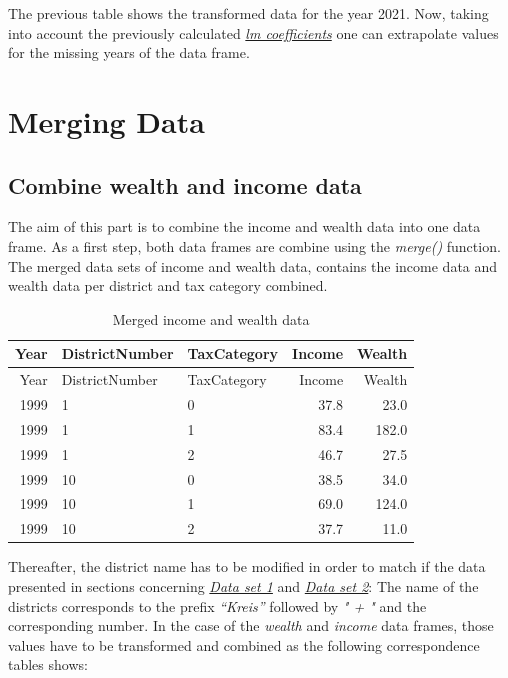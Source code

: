 \documentclass[
]{article}
\begin{document}
The previous table shows the transformed data for the year 2021. Now,
taking into account the previously calculated
\emph{\href{tab:pivot_education1}{lm coefficients}} one can extrapolate
values for the missing years of the data frame.

\pagebreak

\hypertarget{merging-data}{%
\section{Merging Data}\label{merging-data}}

\hypertarget{combine-wealth-and-income-data}{%
\subsection{Combine wealth and income
data}\label{combine-wealth-and-income-data}}

The aim of this part is to combine the income and wealth data into one
data frame. As a first step, both data frames are combine using the
\emph{merge()} function. The merged data sets of income and wealth data,
contains the income data and wealth data per district and tax category
combined.

\begin{longtable}[]{@{}rllrr@{}}
\caption{Merged income and wealth data}\tabularnewline
\toprule
Year & DistrictNumber & TaxCategory & Income & Wealth\tabularnewline
\midrule
\endfirsthead
\toprule
Year & DistrictNumber & TaxCategory & Income & Wealth\tabularnewline
\midrule
\endhead
1999 & 1 & 0 & 37.8 & 23.0\tabularnewline
1999 & 1 & 1 & 83.4 & 182.0\tabularnewline
1999 & 1 & 2 & 46.7 & 27.5\tabularnewline
1999 & 10 & 0 & 38.5 & 34.0\tabularnewline
1999 & 10 & 1 & 69.0 & 124.0\tabularnewline
1999 & 10 & 2 & 37.7 & 11.0\tabularnewline
\bottomrule
\end{longtable}

Thereafter, the district name has to be modified in order to match if
the data presented in sections concerning
\emph{\protect\hyperlink{Dataux5cux2520setux5cux25201:ux5cux2520Turnoutux5cux2520atux5cux2520theux5cux2520cityux5cux2520andux5cux2520municipalux5cux2520councilux5cux2520electionsux5cux2520sinceux5cux25202006ux2cux5cux2520byux5cux2520cityux5cux2520district.}{Data
set 1}} and
\emph{\protect\hyperlink{Dataux5cux2520setux5cux25202:ux5cux2520Municipalux5cux2520electionsux5cux2520voteux5cux2520shareux2cux5cux2520byux5cux2520partyux5cux2520andux5cux2520electoralux5cux2520districtux5cux2520sinceux5cux25201913.}{Data
set 2}}: The name of the districts corresponds to the prefix
\emph{``Kreis''} followed by \emph{" + "} and the corresponding number.
In the case of the \emph{wealth} and \emph{income} data frames, those
values have to be transformed and combined as the following
correspondence tables shows:
\end{document}
